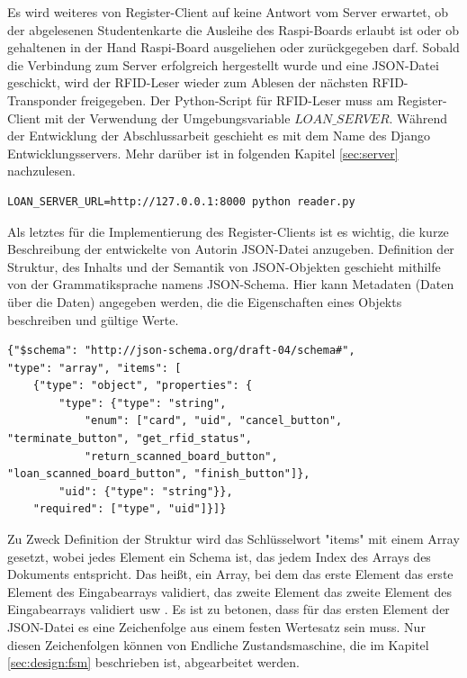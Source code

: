 Es wird weiteres von Register-Client auf keine Antwort vom Server erwartet, ob der abgelesenen Studentenkarte die Ausleihe des Raspi-Boards erlaubt ist oder ob gehaltenen in der Hand Raspi-Board ausgeliehen oder zurückgegeben darf. Sobald die Verbindung zum Server erfolgreich hergestellt wurde und eine JSON-Datei geschickt, wird der RFID-Leser wieder zum Ablesen der nächsten RFID-Transponder freigegeben. Der Python-Script für RFID-Leser muss am Register-Client mit der Verwendung der Umgebungsvariable $LOAN\_SERVER$. Während der Entwicklung der Abschlussarbeit geschieht es mit dem Name des Django Entwicklungsservers. Mehr darüber ist in folgenden Kapitel \ref{sec:server} nachzulesen.
\begin{lstlisting}[caption={[Umgebungsvariable für den Serverstart] },captionpos=b]
LOAN_SERVER_URL=http://127.0.0.1:8000 python reader.py
\end{lstlisting}
Als letztes für die Implementierung des Register-Clients ist es wichtig, die kurze Beschreibung der entwickelte von Autorin JSON-Datei anzugeben. Definition der Struktur, des Inhalts und der Semantik von JSON-Objekten geschieht mithilfe von der Grammatiksprache namens JSON-Schema. Hier kann Metadaten (Daten über die Daten) angegeben werden, die die Eigenschaften eines Objekts beschreiben und gültige Werte. 

\begin{lstlisting}[caption={JSON-Schema},captionpos=b]
{"$schema": "http://json-schema.org/draft-04/schema#",
"type": "array", "items": [
	{"type": "object", "properties": {
		"type": {"type": "string",
			"enum": ["card", "uid", "cancel_button", "terminate_button", "get_rfid_status",
			"return_scanned_board_button", "loan_scanned_board_button", "finish_button"]},
		"uid": {"type": "string"}},
	"required": ["type", "uid"]}]}
\end{lstlisting}

Zu Zweck Definition der Struktur wird das Schlüsselwort "items" mit einem Array gesetzt, wobei jedes Element ein Schema ist, das jedem Index des Arrays des Dokuments entspricht. Das heißt, ein Array, bei dem das erste Element das erste Element des Eingabearrays validiert, das zweite Element das zweite Element des Eingabearrays validiert usw \cite{website:14}. Es ist zu betonen, dass für das ersten Element der JSON-Datei es eine Zeichenfolge aus einem festen Wertesatz sein muss. Nur diesen Zeichenfolgen können von Endliche Zustandsmaschine, die im Kapitel \ref{sec:design:fsm} beschrieben ist, abgearbeitet werden. 

